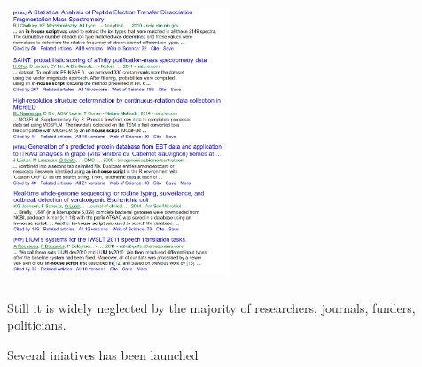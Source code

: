 \documentclass{beamer}
\begin{document}
\begin{frame}
  \frametitle{}
  \begin{center}
    \includegraphics[height=8cm]{images/In-house_script.jpg}
  \end{center}
\end{frame}

\begin{frame}
  \frametitle{}
  \begin{block}{}
    \begin{center}
      Still it is widely neglected by the majority of researchers,
      journals, funders, politicians.
      \end{center}
  \end{block}
\end{frame}

\begin{frame}
  \begin{block}{}
    \begin{center}
      Several iniatives has been launched
    \end{center}
  \end{block}
\end{frame}
\end{document}
